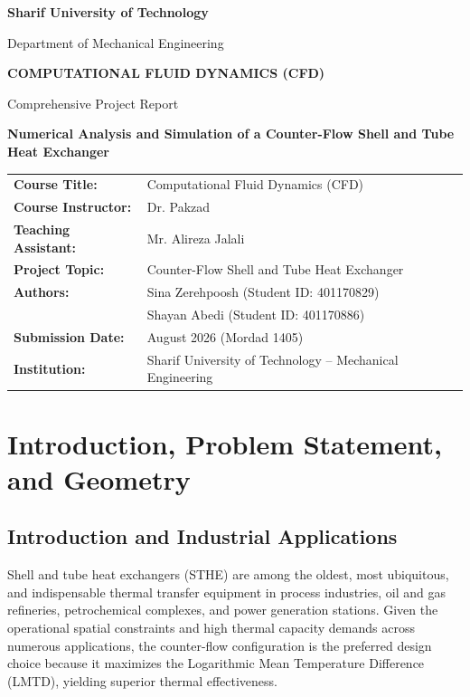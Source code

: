 \documentclass[12pt,a4paper]{report}
\begin{document}
\begin{titlepage}
    \centering
    \vspace*{0.5cm}
    {\Large\textbf{Sharif University of Technology}\par}
    {\large Department of Mechanical Engineering\par}
    \vspace{0.8cm}
    {\large\textbf{COMPUTATIONAL FLUID DYNAMICS (CFD)}\par}
    {\large Comprehensive Project Report\par}
    \vspace{1.5cm}
    {\huge\textbf{Numerical Analysis and Simulation of a Counter-Flow Shell and Tube Heat Exchanger}\par}
    \vspace{2.0cm}
    
    \begin{tabular}{ll}
        \textbf{Course Title:} & Computational Fluid Dynamics (CFD) \\
        \textbf{Course Instructor:} & Dr. Pakzad \\
        \textbf{Teaching Assistant:} & Mr. Alireza Jalali \\
        \textbf{Project Topic:} & Counter-Flow Shell and Tube Heat Exchanger \\
        \textbf{Authors:} & Sina Zerehpoosh (Student ID: 401170829) \\ & Shayan Abedi (Student ID: 401170886) \\

        \textbf{Submission Date:} & August 2026 (Mordad 1405) \\
        \textbf{Institution:} & Sharif University of Technology -- Mechanical Engineering \\
    \end{tabular}
    
    \vfill
\end{titlepage}

\tableofcontents
\newpage
\listoffigures
\newpage
\listoftables
\newpage


\chapter{Introduction, Problem Statement, and Geometry}

\section{Introduction and Industrial Applications}
Shell and tube heat exchangers (STHE) are among the oldest, most ubiquitous, and indispensable thermal transfer equipment in process industries, oil and gas refineries, petrochemical complexes, and power generation stations. Given the operational spatial constraints and high thermal capacity demands across numerous applications, the counter-flow configuration is the preferred design choice because it maximizes the Logarithmic Mean Temperature Difference (LMTD), yielding superior thermal effectiveness.
\end{document}
